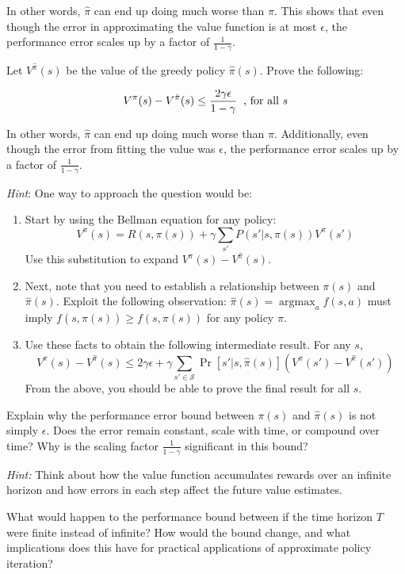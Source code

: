 \documentclass[11pt]{article}
\DeclareMathOperator*{\argmax}{argmax}
\begin{document}
\noindent In other words, $\hat{\pi}$ can end up doing much worse than $\pi$. This shows that even though the error in approximating the value function is at most $\epsilon$, the performance error scales up by a factor of $\frac{1}{1-\gamma}$. 
\newline

 \noindent Let $V^{\hat \pi}(s)$ be the value of the greedy policy $\hat \pi(s)$. Prove the following:

$$V^{\pi}(s) -V^{\hat \pi}(s) \leq  \frac{2\gamma \epsilon}{1-\gamma} \text{\;\;, for all $s$}$$

\noindent In other words, $\hat{\pi}$ can end up doing much worse than $\pi$. Additionally, even though the error from fitting the value was $\epsilon$, the performance error scales up by a factor of $\frac{1}{1-\gamma}$. 

\noindent \textit{Hint}:
One way to approach the question would be:
\begin{enumerate}
    \item Start by using the Bellman equation for any policy:
$$V^{\pi}(s) = R(s,\pi(s)) + \gamma \sum_{s'} P(s'|s,\pi(s)) V^{\pi}(s')$$ 
Use this substitution to expand $V^{\pi}(s) -V^{\hat \pi}(s)$.
\item Next, note that you need to establish a relationship between $\pi(s)$ and $\hat \pi(s)$. Exploit the following observation: $\hat \pi(s) = \argmax_a f(s,a) $ must imply $f(s,\hat \pi(s))  \geq f(s,\pi(s))$ for any policy $\pi$.
\item Use these facts to obtain the following intermediate result. For any $s$,
$$V^{\pi}(s) -V^{\hat \pi}(s) \leq 2\gamma \epsilon + \gamma\sum_{s' \in \mathcal S} \Pr[s' | s, \hat \pi(s)](V^\pi(s') - V^{\hat \pi}(s'))$$
From the above, you should be able to prove the final result for all $s$.
\end{enumerate}

 \noindent Explain why the performance error bound between $\pi(s)$ and $\hat \pi(s)$ is not simply $\epsilon$. Does the error remain constant, scale with time, or compound over time? Why is the scaling factor $\frac{1}{1-\gamma}$ significant in this bound?
\newline

\noindent \textit{Hint:}
Think about how the value function accumulates rewards over an infinite horizon and how errors in each step affect the future value estimates.
\newline

 \noindent What would happen to the performance bound between if the time horizon $T$ were finite instead of infinite? How would the bound change, and what implications does this have for practical applications of approximate policy iteration?
\end{document}
